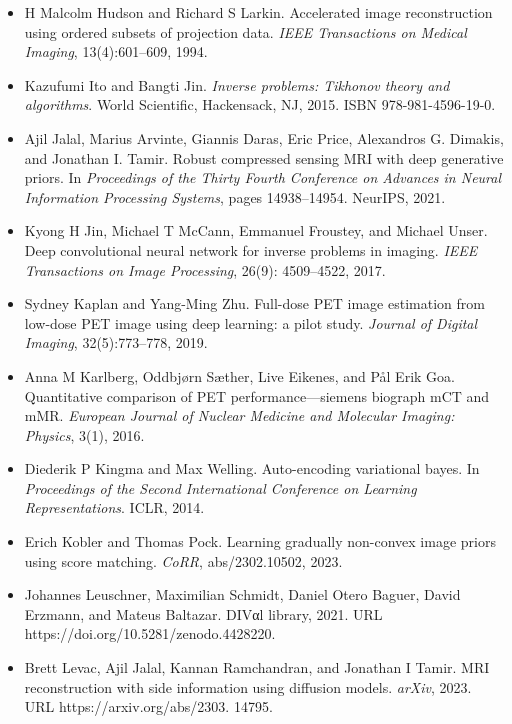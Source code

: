 \documentclass{article}
\begin{document}
\begin{itemize}
\item 
H Malcolm Hudson and Richard S Larkin. Accelerated image reconstruction using ordered subsets of projection data. \textit{IEEE Transactions on Medical Imaging}, 13(4):601–609, 1994.

\item 
Kazufumi Ito and Bangti Jin. \textit{Inverse problems: Tikhonov theory and algorithms}. World Scientific, Hackensack, NJ, 2015. ISBN 978-981-4596-19-0.

\item 
Ajil Jalal, Marius Arvinte, Giannis Daras, Eric Price, Alexandros G. Dimakis, and Jonathan I. Tamir. Robust compressed sensing MRI with deep generative priors. In \textit{Proceedings of the Thirty Fourth Conference on Advances in Neural Information Processing Systems}, pages 14938–14954. NeurIPS, 2021.

\item 
Kyong H Jin, Michael T McCann, Emmanuel Froustey, and Michael Unser. Deep convolutional neural network for inverse problems in imaging. \textit{IEEE Transactions on Image Processing}, 26(9): 4509–4522, 2017.

\item 
Sydney Kaplan and Yang-Ming Zhu. Full-dose PET image estimation from low-dose PET image using deep learning: a pilot study. \textit{Journal of Digital Imaging}, 32(5):773–778, 2019.

\item 
Anna M Karlberg, Oddbjørn Sæther, Live Eikenes, and Pål Erik Goa. Quantitative comparison of PET performance—siemens biograph mCT and mMR. \textit{European Journal of Nuclear Medicine and Molecular Imaging: Physics}, 3(1), 2016.

\item 
Diederik P Kingma and Max Welling. Auto-encoding variational bayes. In \textit{Proceedings of the Second International Conference on Learning Representations}. ICLR, 2014.

\item 
Erich Kobler and Thomas Pock. Learning gradually non-convex image priors using score matching. \textit{CoRR}, abs/2302.10502, 2023.

\item 
Johannes Leuschner, Maximilian Schmidt, Daniel Otero Baguer, David Erzmann, and Mateus Baltazar. DIVαl library, 2021. URL https://doi.org/10.5281/zenodo.4428220.

\item 
Brett Levac, Ajil Jalal, Kannan Ramchandran, and Jonathan I Tamir. MRI reconstruction with side information using diffusion models. \textit{arXiv}, 2023. URL https://arxiv.org/abs/2303. 14795.


\end{itemize}
\end{document}
